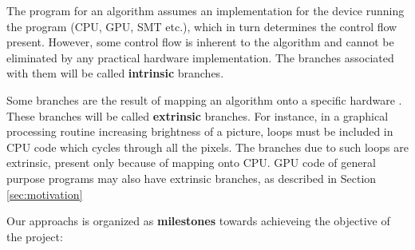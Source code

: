 
\par{
The program for an algorithm assumes an implementation for the device running the program (CPU, GPU, SMT etc.), which in turn determines the control flow present. However, some control flow is inherent to the algorithm and cannot be eliminated by any practical hardware implementation. The branches associated with them will be called \textbf{intrinsic} branches.
}

\par{
Some branches are the result of mapping an algorithm onto a specific hardware . These branches will be called \textbf{extrinsic} branches. For instance, in a graphical processing routine increasing brightness of a picture, loops must be included in CPU code which cycles through all the pixels. The branches due to such loops are extrinsic, present only because of mapping onto CPU. GPU code of general purpose programs may also have extrinsic branches, as described in Section \ref{sec:motivation}  
} 

\par{Our approachs is organized as \textbf{milestones} towards achieveing the objective of the project:}

